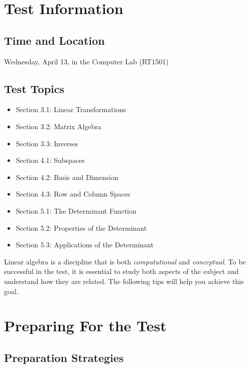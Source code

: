 \documentclass[12pt]{article}
\begin{document}
\sffamily

\section{Test Information}

\subsection{Time and Location}

\begin{center}
{\Large
Wednesday, April 13, in the Computer Lab (RT1501)
}
\end{center}

\subsection{Test Topics}

\begin{itemize}
\item Section 3.1: Linear Transformations
\item Section 3.2: Matrix Algebra
\item Section 3.3: Inverses
\item Section 4.1: Subspaces
\item Section 4.2: Basis and Dimension
\item Section 4.3: Row and Column Spaces
\item Section 5.1: The Determinant Function
\item Section 5.2: Properties of the Determinant
\item Section 5.3: Applications of the Determinant
\end{itemize}

Linear algebra is a discipline that is both \emph{computational} and \emph{conceptual}. To be successful in the test, it is essential to study both aspects of the subject and understand how they are related. The following tips will help you achieve this goal.

\section{Preparing For the Test}

\subsection{Preparation Strategies}
\end{document}
